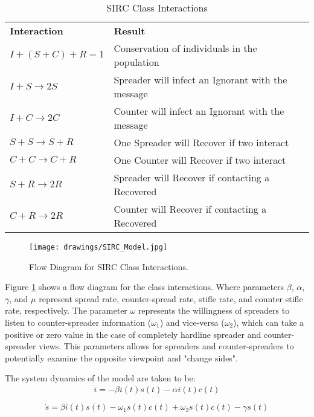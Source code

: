\begin{table}[!htbp]
\centering
\caption{SIRC Class Interactions}
\label{tab:sirc_interactions}
\begin{tabular}{ll}
\textbf{Interaction}    & \textbf{Result}                                   \\
$I + (S + C) + R = 1$     & Conservation of individuals in the population     \\
$I + S \rightarrow 2S$    & Spreader will infect an Ignorant with the message \\
$I + C \rightarrow 2C$    & Counter will infect an Ignorant with the message  \\
$S + S \rightarrow S + R$ & One Spreader will Recover if two interact         \\
$C + C \rightarrow C + R$ & One Counter will Recover if two interact          \\
$S + R \rightarrow 2R$    & Spreader will Recover if contacting a Recovered   \\
$C + R \rightarrow 2R$    & Counter will Recover if contacting a Recovered   
\end{tabular}
\end{table}

\begin{figure}[!htbp]
  \texttt{[image: drawings/SIRC\_Model.jpg]}
  \caption{Flow Diagram for SIRC Class Interactions.}
  \label{fig:sirc_flow}
\end{figure}

Figure \ref{fig:sirc_flow} shows a flow diagram for the class interactions.
Where parameters $\beta$, $\alpha$, $\gamma$, and $\mu$ represent spread rate, counter-spread rate, stifle rate, and counter stifle rate, respectively. The parameter $\omega$ represents the willingness of spreaders to listen to counter-spreader information ($\omega_1$) and vice-versa ($\omega_2$), which can take a positive or zero value in the case of completely hardline spreader and counter-spreader views. This parameters allows for spreaders and counter-spreaders to potentially examine the opposite viewpoint and "change sides".

\noindent The system dynamics of the model are taken to be:\\
\begin{equation}\label{eqn:I_dynamics}
\dot{i} = -\beta i(t)s(t) - \alpha i(t)c(t)
\end{equation}

\begin{equation}\label{eqn:S_dynamics}
\dot{s} = \beta i(t)s(t) - \omega_1 s(t)c(t) + \omega_2 s(t)c(t) - \gamma s(t)
\end{equation}

